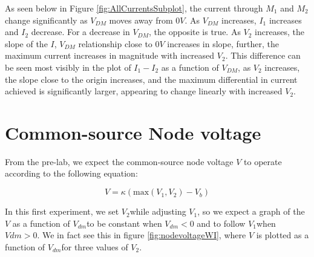\documentclass{article}
\newcommand{\Vtwo}{{$V_{2}$}}
\newcommand{\Vone}{{$V_{1}$}}
\newcommand{\Vdm}{{$V_{dm}$}}
\begin{document}
As seen below in Figure \ref{fig:AllCurrentsSubplot}, the current through $M_1$ and $M_2$ change significantly as $V_{DM}$ moves away from $0V$. As $V_{DM}$ increases, $I_1$ increases and $I_2$ decrease. For a decrease in $V_{DM}$, the opposite is true. 
As $V_2$ increases, the slope of the $I$, $V_{DM}$ relationship close to $0V$ increases in slope, further, the maximum current increases in magnitude with increased $V_2$. This difference can be seen most visibly in the plot of $I_1 -I_2$ as a function of $V_{DM}$, as $V_2$ increases, the slope close to the origin increases, and the maximum differential in current achieved is significantly larger, appearing to change linearly with increased $V_2$.






\section*{Common-source Node voltage}

From the pre-lab, we expect the common-source node voltage $V$ to operate according to the following equation:

\begin{equation}
V = \kappa (\textrm{max}(V_1,V_2) - V_b)
\label{eq:nodevoltageeq}
\end{equation}

In this first experiment, we set \Vtwo while adjusting \Vone, so we expect a graph of the $V$ as a function of \Vdm to be constant when $V_{dm} < 0$ and to follow \Vone when $V{dm} > 0$. We in fact see this in figure \ref{fig:nodevoltageWI}, where $V$ is plotted as a function of \Vdm for three values of \Vtwo.
\end{document}
